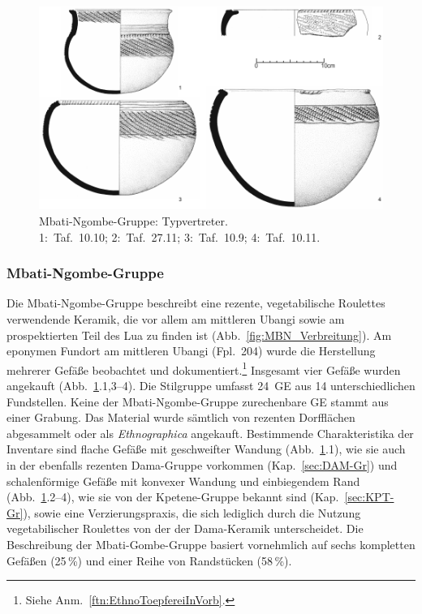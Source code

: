 \begin{figure}[tb]
	\centering
	\includegraphics[width=\textwidth]{fig/MBN-Typen.pdf}
	\caption{Mbati-Ngombe-Gruppe: Typvertreter.\\1:~Taf.~10.10; 2:~Taf.~27.11; 3:~Taf.~10.9; 4:~Taf.~10.11.}
	\label{fig:MBN_Typvertreter}
\end{figure}

\subsubsection{Mbati-Ngombe-Gruppe}\label{sec:MBN-Gr}

Die Mbati-Ngombe-Gruppe beschreibt eine rezente, vegetabilische Roulettes verwendende Keramik, die vor allem am mittleren \mbox{Ubangi} sowie am prospektierten Teil des Lua zu finden ist (Abb.~\ref{fig:MBN_Verbreitung}). Am eponymen Fundort am mittleren \mbox{Ubangi} (Fpl.~204) wurde die Herstellung mehrerer Gefäße beobachtet und dokumentiert.\footnote{Siehe Anm.~\ref{ftn:EthnoToepfereiInVorb}.} Insgesamt vier Gefäße wurden angekauft (Abb.~\ref{fig:MBN_Typvertreter}.1,3--4). Die Stilgruppe umfasst 24~GE aus 14 unterschiedlichen Fundstellen. Keine der Mbati-Ngombe-Gruppe zurechenbare GE stammt aus einer Grabung. Das Material wurde sämtlich von rezenten Dorfflächen abgesammelt oder als \textit{Ethnographica} angekauft. Bestimmende Charakteristika der Inventare sind flache Gefäße mit geschweifter Wandung (Abb.~\ref{fig:MBN_Typvertreter}.1), wie sie auch in der ebenfalls rezenten Dama-Gruppe vorkommen (Kap.~\ref{sec:DAM-Gr}) und schalenförmige Gefäße mit konvexer Wandung und einbiegendem Rand (Abb.~\ref{fig:MBN_Typvertreter}.2--4), wie sie von der Kpetene-Gruppe bekannt sind (Kap.~\ref{sec:KPT-Gr}), sowie eine Verzierungspraxis, die sich lediglich durch die Nutzung vegetabilischer Roulettes von der der Dama-Keramik unterscheidet. Die Beschreibung der Mbati-Gombe-Gruppe basiert vornehmlich auf sechs kompletten Gefäßen (25\,\%) und einer Reihe von Randstücken (58\,\%). 


